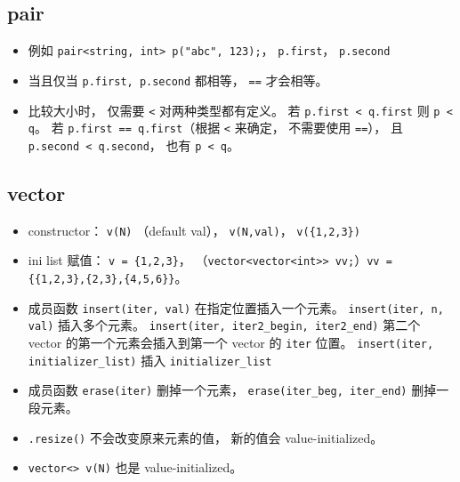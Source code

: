 
\begin{issues}
\issueDraft
\end{issues}

\subsection{pair}
\begin{itemize}
\item 例如 \verb|pair<string, int> p("abc", 123);|， \verb|p.first|， \verb|p.second|
\item 当且仅当 \verb|p.first, p.second| 都相等， \verb|==| 才会相等。
\item 比较大小时， 仅需要 \verb|<| 对两种类型都有定义。 若 \verb|p.first < q.first| 则 \verb|p < q|。 若 \verb|p.first == q.first|（根据 \verb|<| 来确定， 不需要使用 \verb|==|）， 且 \verb|p.second < q.second|， 也有 \verb|p < q|。
\end{itemize}

\subsection{vector}
\begin{itemize}
\item constructor： \verb|v(N)| （default val）， \verb|v(N,val)|， \verb|v({1,2,3})|
\item ini list 赋值： \verb|v = {1,2,3}|， （\verb|vector<vector<int>> vv;|）\verb|vv = {{1,2,3},{2,3},{4,5,6}}|。
\item 成员函数 \verb|insert(iter, val)| 在指定位置插入一个元素。 \verb|insert(iter, n, val)| 插入多个元素。 \verb|insert(iter, iter2_begin, iter2_end)| 第二个 vector 的第一个元素会插入到第一个 vector 的 \verb|iter| 位置。 \verb|insert(iter, initializer_list)| 插入 \verb|initializer_list|
\item 成员函数 \verb|erase(iter)| 删掉一个元素， \verb|erase(iter_beg, iter_end)| 删掉一段元素。
\item \verb|.resize()| 不会改变原来元素的值， 新的值会 value-initialized。
\item \verb|vector<> v(N)| 也是 value-initialized。
\end{itemize}

